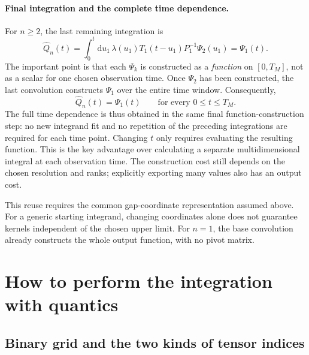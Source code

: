 \documentclass[11pt]{article}
\begin{document}
\paragraph{Final integration and the complete time dependence.}
For $n\geq2$, the last remaining integration is
\begin{equation}
    \boxed{\widehat Q_n(t)=
    \int_0^t\!\mathrm{d}u_1\,\lambda(u_1)T_1(t-u_1)P_1^{-1}\Psi_2(u_1)
    =\Psi_1(t).}
    \label{eq:correct_final}
\end{equation}
The important point is that each $\Psi_k$ is constructed as a
\emph{function} on $[0,T_M]$, not as a scalar for one chosen observation
time. Once $\Psi_2$ has been constructed, the last convolution constructs
$\Psi_1$ over the entire time window. Consequently,
\begin{equation}
    \boxed{\widehat Q_n(t)=\Psi_1(t)
        \qquad\text{for every }0\leq t\leq T_M.}
\end{equation}
The full time dependence is thus obtained in the same final
function-construction step: no new integrand fit and no repetition of
the preceding integrations are required for each time point. Changing
$t$ only requires evaluating the resulting function. This is the key
advantage over calculating a separate multidimensional integral at each
observation time. The construction cost still depends on the chosen
resolution and ranks; explicitly exporting many values also has an
output cost.

This reuse requires the common gap-coordinate representation assumed
above. For a generic starting integrand, changing coordinates alone does
not guarantee kernels independent of the chosen upper limit.
For $n=1$, the base convolution already constructs the whole output
function, with no pivot matrix.

\section{How to perform the integration with quantics}

\subsection{Binary grid and the two kinds of tensor indices}
\end{document}
